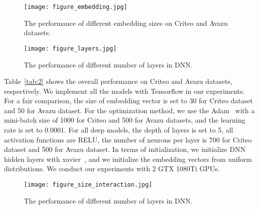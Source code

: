\documentclass[journal]{IEEEtran}
\begin{document}
\begin{figure*}
	\texttt{[image: figure\_embedding.jpg]}
	\caption{The performance of different embedding sizes on Criteo and Avazu datasets.} \label{fig:embedding}
\end{figure*}
\begin{figure*}
	\texttt{[image: figure\_layers.jpg]}
	\caption{The performance of different number of layers in DNN.} \label{fig:layers}
\end{figure*}
Table~\ref{tab:2} shows the overall performance on Criteo and Avazu datasets, respectively. We implement all the models with Tensorflow in our experiments. For a fair comparison, the size of embedding vector is set to 30 for Criteo dataset and 50 for Avazu dataset. For the optimization method, we use the Adam~\cite{43} with a mini-batch size of 1000 for Criteo and 500 for Avazu datasets, and the learning rate is set to 0.0001. For all deep models, the depth of layers is set to 5, all activation functions are RELU, the number of neurons per layer is 700 for Criteo dataset and 500 for Avazu dataset. In terms of initialization, we initialize DNN hidden layers with xavier~\cite{71}, and we initialize the embedding vectors from uniform distributions. We conduct our experiments with 2 GTX 1080Ti GPUs.
\begin{table*}[!t]
	\centering
\caption{Performance comparison between BN and dropout.}
	\label{tab:3}       
\end{table*}
\begin{figure*}
	\texttt{[image: figure\_size\_interaction.jpg]}
	\caption{The performance of different number of layers in DNN.} \label{fig:size_interaction}
\end{figure*}
\end{document}
